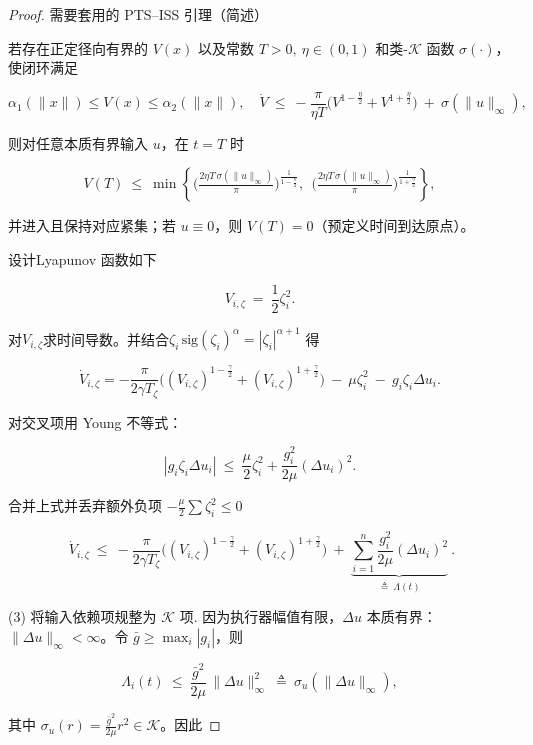 \documentclass[pdflatex,sn-mathphys-num]{sn-jnl}%
\theoremstyle{thmstyleone}%
\theoremstyle{thmstyletwo}%
\theoremstyle{thmstylethree}%
\begin{document}
	\begin{proof}
	
	
	 需要套用的 PTS–ISS 引理（简述）
	
	若存在正定径向有界的 $V(x)$ 以及常数 $T>0,\ \eta\in(0,1)$ 和类-$\mathcal K$ 函数 $\sigma(\cdot)$，使闭环满足
	
	$$
	\alpha_1(\|x\|)\le V(x)\le \alpha_2(\|x\|),\quad
	\dot V \ \le\ -\frac{\pi}{\eta T}\Big(V^{1-\frac{\eta}{2}}+V^{1+\frac{\eta}{2}}\Big)\ +\ \sigma(\|u\|_\infty),
	$$
	
	则对任意本质有界输入 $u$，在 $t=T$ 时
	
	$$
	V(T)\ \le\ \min\!\left\{
	\Big(\tfrac{2\eta T\,\sigma(\|u\|_\infty)}{\pi}\Big)^{\!\frac{1}{1-\frac{\eta}{2}}},
	\ \ 
	\Big(\tfrac{2\eta T\,\sigma(\|u\|_\infty)}{\pi}\Big)^{\!\frac{1}{1+\frac{\eta}{2}}}
	\right\},
	$$
	
	并进入且保持对应紧集；若 $u\equiv0$，则 $V(T)=0$（预定义时间到达原点）。
	
	设计Lyapunov 函数如下
	
	$$
	V_{i,\zeta}\ =\ \frac12\zeta_i^2.
	$$
	
	对$V_{i,\zeta}$求时间导数。并结合$\zeta_i\,\mathrm{sig}(\zeta_i)^\alpha=|\zeta_i|^{\alpha+1}$ 得
	
	$$
	\dot V_{i,\zeta}= -\frac{\pi}{2\gamma T_\zeta}\Big((V_{i,\zeta})^{1-\frac{\gamma}{2}}+(V_{i,\zeta})^{1+\frac{\gamma}{2}}\Big)\ -\ \mu\zeta_i^2\ -\  g_i\zeta_i\Delta u_i.
	$$
	
	
	
	对交叉项用 Young 不等式：
	
	$$
	|g_i\zeta_i\Delta u_i|\ \le\ \frac{\mu}{2}\zeta_i^2+\frac{g_i^2}{2\mu}(\Delta u_i)^2 .
	$$
	
	合并上式并丢弃额外负项 $-\frac{\mu}{2}\sum\zeta_i^2\le0$
	
	$$
	\boxed{\;
	\dot V_{i,\zeta}
	\ \le\
	-\frac{\pi}{2\gamma T_\zeta}\Big((V_{i,\zeta})^{1-\frac{\gamma}{2}}+(V_{i,\zeta})^{1+\frac{\gamma}{2}}\Big)
	\ +\ \underbrace{\sum_{i=1}^{n}\frac{g_i^2}{2\mu}(\Delta u_i)^2}_{\displaystyle \triangleq\ \Lambda(t)}\ .
	}
	$$
	
	(3) 将输入依赖项规整为 $\mathcal K$ 项.
	因为执行器幅值有限，$\Delta u$ 本质有界：$\|\Delta u\|_\infty<\infty$。令 $\bar g\ge \max_i|g_i|$，则
	
	$$
	\Lambda_i(t)\ \le\ \frac{\bar g^2}{2\mu}\,\|\Delta u\|_\infty^2\ \triangleq\ \sigma_u(\|\Delta u\|_\infty),
	$$
	
	其中 $\sigma_u(r)=\frac{\bar g^2}{2\mu} r^2\in\mathcal K$。因此
	

\end{proof}
\end{document}
